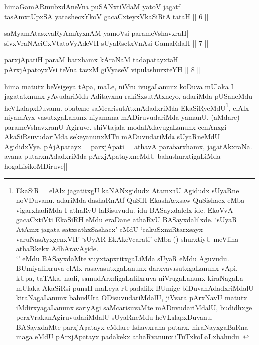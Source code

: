 
\begin{shl}
himaGamARmubxdAneVna puSANxtiVdaM yatoV jagatf| \\
tasAmxtUpxSA yatashecxYkoV gacaCxteyxVkaSiRtA tataH \hfill||  6 || 
\end{shl}

\begin{shl}
saMyamAtasxvaRyAmAyxnAM yamoV\s si parameVshavxraH| \\
sivxVraNAciCxVtatoVyAdeVH sUyaRsetxVnAsi GamaRdaH \hfill||  7 ||
\end{shl}

\begin{shl}
parxjApatiH paraM barxhamx kAraNaM tadapatayxtaH| \\
pArxjApatoyxV\s si teVna tavxM giVyaseV vipulashurxteYH \hfill||  8 || 
\end{shl}

\begin{artha} 
hima matutx beVsigeya tApa, maLe, niVru ivugaLanunx koDuva mUlaka I 
jagatatxnunx yAvudariMda Aditayxnu rakiSxsutAtxneyo, adariMda 
pUSaneMdu heVLalapxDuvanu. obabxne saMcarisutAtxnAdadxriMda 
EkaSiRyeMdU\footnote[2]{EkaSiR = elAlx jagatitxgU kaNANxgidudx AtamxnU 
Agidudx sUyaRne noVDuvanu. adariMda dashaRnAtf QuSiH EkashAcxsaw 
QuSishacx eMba vigarxhadiMda I athaRvU laBisuvudu. idu BASayxdalelx 
ide. EkoVvA gacaCxtiVti EkaSiRH eMdu eraDane athaRvU BASayxdalilxde. 
`sUyaR AtAmx jagata satxsathxSashacx' eMdU `cakuSxmiRtarxsayx 
varuNasAyxgenxVH' `sUyAR EkAkeVcarati' eMba () shurxtiyU meVlina 
athaRkekx AdhAravAgide.\\ 
`\stext' eMdu BASayxdaMte vuyxtapxtitxgaLiMda sUyaR eMdu Aguvudu. 
BUmiyalilxruva elAlx rasavasutxgaLanunx darxvavasutxgaLanunx vApi, 
kUpa, taTAka, nadi, samudArxdigaLalilxruva niVrugaLanunx kiraNagaLa 
mUlaka AkaSiRsi punaH maLeya rUpadalilx BUmige biDuvanAdadxriMdalU 
kiraNagaLanunx bahudUra ODisuvudariMdalU, jiVvara pArxNavU matutx 
iMdirxyagaLanunx sariyAgi saMcarisuvaMte mADuvudariMdalU, budidhxge 
perxVrakanAgiruvudariMdalU sUyaRneMdu heVLalapxDuvanu. BASayxdaMte 
parxjApatayx eMdare Ishavxrana putarx. hiraNayxgaBaRna maga eMdU 
pArxjApatayx padakekx athaRvanunx iTuTxkoLaLxbahudu||}, 
elAlx niyamAyx vasutxgaLanunx niyamana 
mADiruvudariMda yamanU, (aMdare) parameVshavxranU Agiruve. shiVtajala 
modalAdavugaLanunx cenAnxgi AkaSiRsuvudariMda sekeyanunxMTu 
mADuvudariMda sUyaRneMdU AgididxVye. pAjApatayx = parxjApati = athavA 
parabarxhamx, jagatAkxraNa. avana putarxnAdadxriMda pArxjApatayxneMdU 
bahushurxtigaLiMda hogaLisikoMDiruve||
\end{artha}

